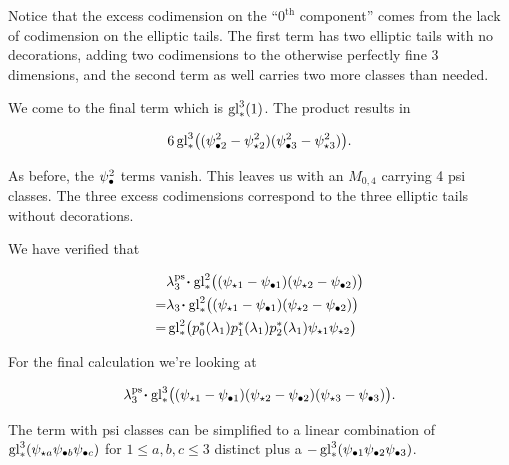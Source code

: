 \documentclass[12pt]{memoir}
\begin{document}
\begin{Rmk}
    Notice that the excess codimension on the ``\(0^{\text{th}}\) component'' comes from the lack of codimension on the elliptic tails. The first term has two elliptic tails with no decorations, adding two codimensions to the otherwise perfectly fine 3 dimensions, and the second term as well carries two more classes than needed.
\end{Rmk}

\begin{ptcb}
    We come to the final term which is \(\operatorname{gl}_\ast^3(1)\). The product results in

    \[6\operatorname{gl}_\ast^3\bigl((\psi_{\bullet2}^2-\psi_{\star2}^2)(\psi_{\bullet3}^2-\psi_{\star3}^2)\bigr).\]

    As before, the \(\psi_{\bullet}^2\) terms vanish. This leaves us with an \(M_{0,4}\) carrying 4 psi classes. The three excess codimensions correspond to the three elliptic tails without decorations.
\end{ptcb}

We have verified that

\begin{align*}
      & \la_3^{\ps}\.\glu_\ast^2\bigl((\psi_{\star1}-\psi_{\81})(\psi_{\star2}-\psi_{\82})\bigr)       \\
    = & \la_3\.\glu_\ast^2\bigl((\psi_{\star1}-\psi_{\81})(\psi_{\star2}-\psi_{\82})\bigr)             \\
    = & \glu_\ast^2\bigl(p_0^\ast(\la_1)p_1^\ast(\la_1)p_2^\ast(\la_1)\psi_{\star1}\psi_{\star2}\bigr)
\end{align*}

For the final calculation we're looking at


\[\la_3^{\ps}\.\glu_\ast^3\bigl((\psi_{\star1}-\psi_{\81})(\psi_{\star2}-\psi_{\82})(\psi_{\star3}-\psi_{\83})\bigr).\]


The term with psi classes can be simplified to a linear combination of \(\operatorname{gl}_\ast^3(\psi_{\star a}\psi_{\bullet b}\psi_{\bullet c})\) for \(1\leq a,b,c\leq 3\) distinct plus a \(-\operatorname{gl}_\ast^3(\psi_{\bullet1}\psi_{\bullet2}\psi_{\bullet3})\).
\end{document}
